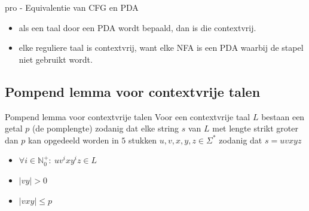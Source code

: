 \begin{pro}{pro - Equivalentie van CFG en PDA}
    \begin{itemize}
        \item als een taal door een PDA wordt bepaald, dan is die contextvrij.
        \item elke reguliere taal is contextvrij, want elke NFA is een PDA waarbij de stapel niet gebruikt wordt.
    \end{itemize}
\end{pro}


\subsection{Pompend lemma voor contextvrije talen}

\vspace{0.5cm}

\begin{lem}{Pompend lemma voor contextvrije talen}
    \vspace{-0.1cm}
    Voor een contextvrije taal $L$ bestaan een getal $p$ (de pomplengte) zodanig dat elke string $s$ van $L$ met lengte
    strikt groter dan $p$ kan opgedeeld worden in $5$ stukken $u,v,x,y,z \in \Sigma^*$ zodanig dat $s = uvxyz$
    \begin{itemize}
        \item $\forall i \in \mathbb{N}_0^+: \ uv^ixy^iz \in L$
        \item $|vy| > 0$
        \item $|vxy| \leq p$
    \end{itemize}
    \vspace{-0.2cm}
\end{lem}

